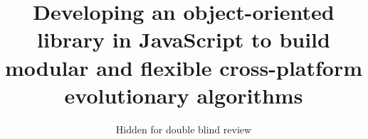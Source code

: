 \documentclass[runningheads,a4paper]{llncs}
\begin{document}
\mainmatter  %

\title{Developing an object-oriented library in JavaScript to build modular and flexible cross-platform evolutionary algorithms}


%
%

\author{Hidden for double blind review}
%
%



%


%
%

\maketitle
\end{document}
